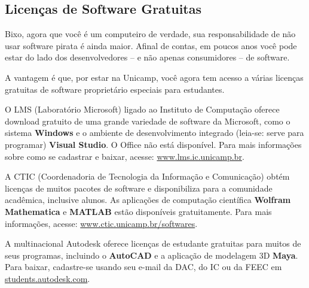 \subsection{Licenças de Software Gratuitas}

Bixo, agora que você é um computeiro de verdade, sua responsabilidade de não
usar software pirata é ainda maior. Afinal de contas, em poucos anos você pode
estar do lado dos desenvolvedores -- e não apenas consumidores -- de software.

A vantagem é que, por estar na Unicamp, você agora tem acesso a várias licenças
gratuitas de software proprietário especiais para estudantes.

O LMS (Laboratório Microsoft) ligado ao Instituto de Computação oferece download
gratuito de uma grande variedade de software da Microsoft, como o sistema
\textbf{Windows} e o ambiente de desenvolvimento integrado (leia-se: serve para
programar) \textbf{Visual Studio}. O Office não está disponível. Para mais
informações sobre como se cadastrar e baixar, acesse:
\url{www.lms.ic.unicamp.br}.

A CTIC (Coordenadoria de Tecnologia da Informação e Comunicação) obtém licenças
de muitos pacotes de software e disponibiliza para a comunidade acadêmica,
inclusive alunos. As aplicações de computação científica \textbf{Wolfram
Mathematica} e \textbf{MATLAB} estão disponíveis gratuitamente. Para mais
informações, acesse: \url{www.ctic.unicamp.br/softwares}.

A multinacional Autodesk oferece licenças de estudante gratuitas para muitos de
seus programas, incluindo o \textbf{AutoCAD} e a aplicação de modelagem 3D
\textbf{Maya}. Para baixar, cadastre-se usando seu e-mail da DAC, do IC ou da
FEEC em \url{students.autodesk.com}.
